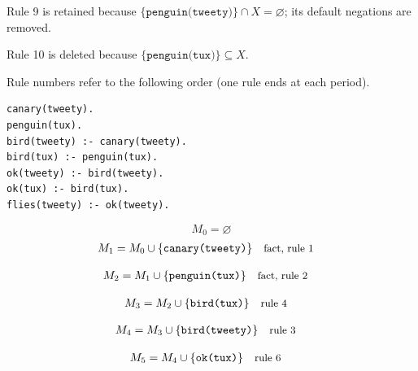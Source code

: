 \documentclass[a4paper,11pt]{article}
\newif\ifexplain
\newcommand{\explain}[1]{\ifexplain\begin{erklbox}#1\end{erklbox}\fi}
\newcommand{\why}[1]{\text{\small #1}}
\newcommand{\at}[1]{\texttt{#1}}
\begin{document}
Rule 9 is retained because $\{\at{penguin(tweety)}\}\cap X=\varnothing$; its default negations are removed.

Rule 10 is deleted because $\{\at{penguin(tux)}\}\subseteq X$.

Rule numbers refer to the following order (one rule ends at each period).
\begin{small}
\begin{verbatim}
canary(tweety).
penguin(tux).
bird(tweety) :- canary(tweety).
bird(tux) :- penguin(tux).
ok(tweety) :- bird(tweety).
ok(tux) :- bird(tux).
flies(tweety) :- ok(tweety).
\end{verbatim}
\end{small}
\explain{Beim Redukt bleibt die Kandidatenmenge fest. Wir entscheiden zuerst, welche Regeln wegfallen. Erst danach berechnen wir aus den verbleibenden positiven Regeln die kleinste abgeschlossene Menge. Ein Modell allein reicht nicht: Diese Menge muss genau der Kandidat sein.}
\[
M_0=\varnothing
\]
\begin{align*}
M_{1} &= M_{0}\cup \{\at{canary(tweety)}\} && \why{fact, rule 1}
\end{align*}
\explain{Diese Regel hat keinen Körper. Ihr Kopf $\at{canary(tweety)}$ ist damit ein Fakt und muss in die Menge.}
\begin{align*}
M_{2} &= M_{1}\cup \{\at{penguin(tux)}\} && \why{fact, rule 2}
\end{align*}
\explain{Diese Regel hat keinen Körper. Ihr Kopf $\at{penguin(tux)}$ ist damit ein Fakt und muss in die Menge.}
\begin{align*}
M_{3} &= M_{2}\cup \{\at{bird(tux)}\} && \why{rule 4}
\end{align*}
\explain{Für $\at{bird(tux)}$ brauchen wir $\at{penguin(tux)}$. Weil diese Voraussetzungen bereits hergeleitet sind, dürfen wir den Regelkopf jetzt aufnehmen und alle bisherigen Atome behalten; bei einer fehlenden Voraussetzung würde diese Regel dagegen noch nichts beitragen.}
\begin{align*}
M_{4} &= M_{3}\cup \{\at{bird(tweety)}\} && \why{rule 3}
\end{align*}
\explain{Für $\at{bird(tweety)}$ brauchen wir $\at{canary(tweety)}$. Weil diese Voraussetzungen bereits hergeleitet sind, dürfen wir den Regelkopf jetzt aufnehmen und alle bisherigen Atome behalten; bei einer fehlenden Voraussetzung würde diese Regel dagegen noch nichts beitragen.}
\begin{align*}
M_{5} &= M_{4}\cup \{\at{ok(tux)}\} && \why{rule 6}
\end{align*}
\end{document}

